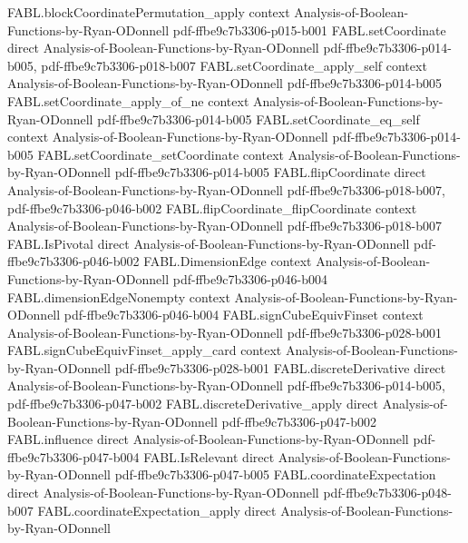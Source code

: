 \begin{theorem}
\proofstep
  {FABL.blockCoordinatePermutation_apply}
  {context}
  {Analysis-of-Boolean-Functions-by-Ryan-ODonnell}
  {pdf-ffbe9c7b3306-p015-b001}
\proofstep
  {FABL.setCoordinate}
  {direct}
  {Analysis-of-Boolean-Functions-by-Ryan-ODonnell}
  {pdf-ffbe9c7b3306-p014-b005,
    pdf-ffbe9c7b3306-p018-b007}
\proofstep
  {FABL.setCoordinate_apply_self}
  {context}
  {Analysis-of-Boolean-Functions-by-Ryan-ODonnell}
  {pdf-ffbe9c7b3306-p014-b005}
\proofstep
  {FABL.setCoordinate_apply_of_ne}
  {context}
  {Analysis-of-Boolean-Functions-by-Ryan-ODonnell}
  {pdf-ffbe9c7b3306-p014-b005}
\proofstep
  {FABL.setCoordinate_eq_self}
  {context}
  {Analysis-of-Boolean-Functions-by-Ryan-ODonnell}
  {pdf-ffbe9c7b3306-p014-b005}
\proofstep
  {FABL.setCoordinate_setCoordinate}
  {context}
  {Analysis-of-Boolean-Functions-by-Ryan-ODonnell}
  {pdf-ffbe9c7b3306-p014-b005}
\proofstep
  {FABL.flipCoordinate}
  {direct}
  {Analysis-of-Boolean-Functions-by-Ryan-ODonnell}
  {pdf-ffbe9c7b3306-p018-b007,
    pdf-ffbe9c7b3306-p046-b002}
\proofstep
  {FABL.flipCoordinate_flipCoordinate}
  {context}
  {Analysis-of-Boolean-Functions-by-Ryan-ODonnell}
  {pdf-ffbe9c7b3306-p018-b007}
\proofstep
  {FABL.IsPivotal}
  {direct}
  {Analysis-of-Boolean-Functions-by-Ryan-ODonnell}
  {pdf-ffbe9c7b3306-p046-b002}
\proofstep
  {FABL.DimensionEdge}
  {context}
  {Analysis-of-Boolean-Functions-by-Ryan-ODonnell}
  {pdf-ffbe9c7b3306-p046-b004}
\proofstep
  {FABL.dimensionEdgeNonempty}
  {context}
  {Analysis-of-Boolean-Functions-by-Ryan-ODonnell}
  {pdf-ffbe9c7b3306-p046-b004}
\proofstep
  {FABL.signCubeEquivFinset}
  {context}
  {Analysis-of-Boolean-Functions-by-Ryan-ODonnell}
  {pdf-ffbe9c7b3306-p028-b001}
\proofstep
  {FABL.signCubeEquivFinset_apply_card}
  {context}
  {Analysis-of-Boolean-Functions-by-Ryan-ODonnell}
  {pdf-ffbe9c7b3306-p028-b001}
\proofstep
  {FABL.discreteDerivative}
  {direct}
  {Analysis-of-Boolean-Functions-by-Ryan-ODonnell}
  {pdf-ffbe9c7b3306-p014-b005,
    pdf-ffbe9c7b3306-p047-b002}
\proofstep
  {FABL.discreteDerivative_apply}
  {direct}
  {Analysis-of-Boolean-Functions-by-Ryan-ODonnell}
  {pdf-ffbe9c7b3306-p047-b002}
\proofstep
  {FABL.influence}
  {direct}
  {Analysis-of-Boolean-Functions-by-Ryan-ODonnell}
  {pdf-ffbe9c7b3306-p047-b004}
\proofstep
  {FABL.IsRelevant}
  {direct}
  {Analysis-of-Boolean-Functions-by-Ryan-ODonnell}
  {pdf-ffbe9c7b3306-p047-b005}
\proofstep
  {FABL.coordinateExpectation}
  {direct}
  {Analysis-of-Boolean-Functions-by-Ryan-ODonnell}
  {pdf-ffbe9c7b3306-p048-b007}
\proofstep
  {FABL.coordinateExpectation_apply}
  {direct}
  {Analysis-of-Boolean-Functions-by-Ryan-ODonnell}

\end{theorem}
